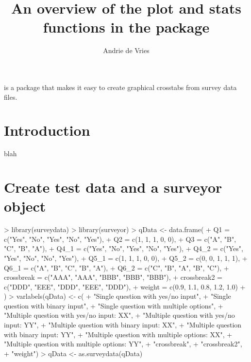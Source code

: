 \documentclass[10pt,oneside]{article}
\begin{document}
\pagestyle{empty}

\setlength{\baselineskip}{1.25em}
\setlength{\parskip}{0.5em}
\setlength{\parindent}{0.0em}



\title{An overview of the plot and stats functions in the \surveyor{} package}
\author{Andrie de Vries}
\maketitle{}

\surveyor{} is a package that makes it easy to create graphical crosstabs from survey data files.  


\section{Introduction}

blah


\section{Create test data and a surveyor object}

\begin{Schunk}
\begin{Sinput}
> library(surveydata)
> library(surveyor)
> qData <- data.frame(
+     Q1 = c("Yes", "No", "Yes", "No", "Yes"),
+     Q2 = c(1, 1, 1, 0, 0),
+     Q3 = c("A", "B", "C", "B", "A"),
+     Q4_1 = c("Yes", "No", "Yes", "No", "Yes"), 
+     Q4_2 = c("Yes", "Yes", "No", "No", "Yes"), 
+     Q5_1 = c(1, 1, 1, 0, 0),
+     Q5_2 = c(0, 0, 1, 1, 1),
+     Q6_1 = c("A", "B", "C", "B", "A"),
+     Q6_2 = c("C", "B", "A", "B", "C"),
+     crossbreak = c("AAA", "AAA", "BBB", "BBB", "BBB"), 
+     crossbreak2 = c("DDD", "EEE", "DDD", "EEE", "DDD"),
+     weight = c(0.9, 1.1, 0.8, 1.2, 1.0)
+ )
> varlabels(qData) <- c(
+     "Single question with yes/no input", 
+     "Single question with binary input",
+     "Single question with multiple options",
+     "Multiple question with yes/no input: XX", 
+     "Multiple question with yes/no input: YY", 
+     "Multiple question with binary input: XX",
+     "Multiple question with binary input: YY",
+     "Multiple question with multiple options: XX",
+     "Multiple question with multiple options: YY",
+     "crossbreak",
+     "crossbreak2",
+     "weight")
> qData <- as.surveydata(qData)
\end{Sinput}
\end{Schunk}
\end{document}
